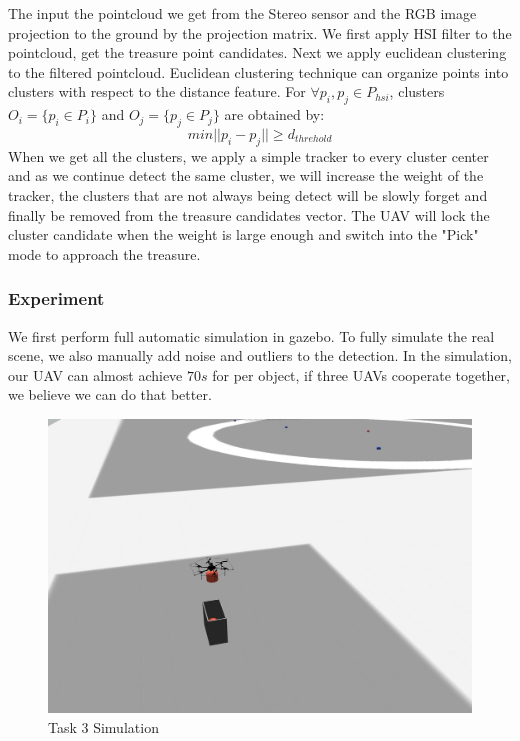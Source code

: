 \documentclass{standalone}
\begin{document}
The input the pointcloud we get from the Stereo sensor and the RGB image projection to the ground by the projection matrix. We first apply HSI filter to the pointcloud, get the treasure point candidates. Next we apply euclidean clustering to the filtered pointcloud. Euclidean clustering technique can organize points into clusters with respect to the distance feature. For $\forall p_i, p_j \in P_{hsi}$, clusters $O_i = \{p_i \in P_i\}$ and $O_j = \{p_j \in P_j\}$ are obtained by:
\begin{equation}\label{eq3-1}
min||p_i - p_j|| \geq d_{threhold} 
\end{equation}
When we get all the clusters, we apply a simple tracker to every cluster center and as we continue detect the same cluster, we will increase the weight of the tracker, the clusters that are not always being detect will be slowly forget and finally be removed from the treasure candidates vector. The UAV will lock the cluster candidate when the weight is large enough and switch into the "Pick" mode to approach the treasure.

\subsubsection{Experiment}
We first perform full automatic simulation in gazebo. To fully simulate the real scene, we also manually add noise and outliers to the detection. In the simulation, our UAV can almost achieve $70s$ for per object, if three UAVs cooperate together, we believe we can do that better.


    
     \begin{figure}%
    \begin{center}
        \includegraphics[keepaspectratio=true, width=1\linewidth, height=0.20\textheight]{img//t3simu.jpg}
      \end{center}
    \caption{Task 3 Simulation}
    \label{t3state}
    \end{figure}
\end{document}
